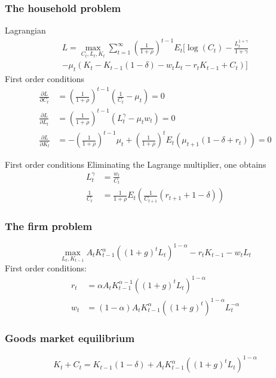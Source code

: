 \documentclass{beamer}
\begin{document}
\begin{frame}
  \frametitle{The household problem}
  Lagrangian
\begin{multline*}
L = \max_{C_t,L_t,K_t} \sum_{t=1}^\infty \left( \frac{1}{1+\rho }\right) ^{t-1}E_{t}\Big[ \log
\left( C_{t}\right) -\frac{L_{t}^{1+\gamma }}{1+\gamma }\\
-\mu_t\left(K_t-K_{t-1}\left( 1-\delta \right) -w_{t}L_{t}-r_{t}K_{t-1}+C_{t}\right)\Big]
\end{multline*}
First order conditions
\begin{align*}
  \frac{\partial L}{\partial C_t} &= \left( \frac{1}{1+\rho }\right) ^{t-1}\left(\frac{1}{C_t}-\mu_t\right) = 0\\
  \frac{\partial L}{\partial L_t} &= \left( \frac{1}{1+\rho }\right) ^{t-1}\left(L_t^\gamma-\mu_tw_t\right) = 0\\
  \frac{\partial L}{\partial K_t} &= -\left( \frac{1}{1+\rho }\right) ^{t-1}\mu_t+\left( \frac{1}{1+\rho }\right) ^tE_t\left(\mu_{t+1}(1-\delta+r_t)\right) = 0
\end{align*}
\end{frame}

\begin{frame}{First order conditions}
Eliminating the Lagrange multiplier, one obtains
\begin{align*}
L_t^\gamma&=\frac{w_t}{C_t}\\
\frac{1}{C_t}&=\frac{1}{1+\rho}E_t\left(\frac{1}{C_{t+1}}(r_{t+1}+1-\delta)\right)
\end{align*}

\end{frame}

\begin{frame}
  \frametitle{The firm problem}
  \[
  \max_{L_t,K_{t-1}} A_tK_{t-1}^\alpha\left( \left( 1+g\right) ^{t}L_t\right)^{1-\alpha}-r_tK_{t-1}-w_tL_t
  \]
First order conditions:
\begin{align*}
  r_t &= \alpha A_tK_{t-1}^{\alpha-1}\left( \left( 1+g\right) ^{t}L_t\right)^{1-\alpha}\\
  w_t &= (1-\alpha) A_tK_{t-1}^\alpha\left( \left( 1+g\right) ^{t}\right)^{1-\alpha}L_t^{-\alpha}
\end{align*}
\end{frame}

\begin{frame}
  \frametitle{Goods market equilibrium}
  \[
  K_t+C_t = K_{t-1}(1-\delta)+A_tK_{t-1}^\alpha\left( \left( 1+g\right) ^{t}L_t\right)^{1-\alpha}
  \]
\end{frame}
\end{document}
